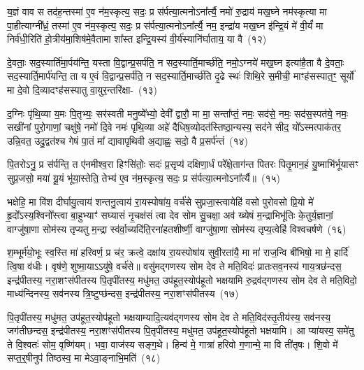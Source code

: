 य॒ज्ञं वाव स तद॑ह॒न्तस्मा॑ ए॒व न॑म॒स्कृत्य॒ सदः॒ प्र स॑र्पत्या॒त्मनो\-ऽना᳚र्त्यै॒ नमो॑ रु॒द्राय॑ मख॒घ्ने नम॑स्कृत्या मा पा॒हीत्याग्नी᳚ध्रं॒ तस्मा॑ ए॒व न॑म॒स्कृत्य॒ सदः॒ प्र स॑र्पत्या॒त्मनो\-ऽना᳚र्त्यै॒ नम॒ इन्द्रा॑य मख॒घ्न इ॑न्द्रि॒यं मे॑ वी॒र्यं॑ मा निर्व॑धी॒रिति॑ हो॒त्रीय॑मा॒शिष॑मे॒वैतामा शा᳚स्त इन्द्रि॒यस्य॑ वी॒र्य॑स्यानि॑र्घाताय॒ या वै~(१२)

दे॒वताः॒ सद॒स्यार्ति॑मा॒र्पय॑न्ति॒ यस्ता वि॒द्वान्प्र॒सर्प॑ति॒ न सद॒स्यार्ति॒मार्च्छ॑ति॒ नमो॒\-ऽग्नये॑ मख॒घ्न इत्या॑है॒ता वै दे॒वताः॒ सद॒स्यार्ति॒मार्प॑यन्ति॒ ता य ए॒वं वि॒द्वान्प्र॒सर्प॑ति॒ न सद॒स्यार्ति॒मार्च्छ॑ति दृ॒ढे स्थः॑ शिथि॒रे स॒मीची॒ माꣳह॑सस्पात॒ꣳ॒ सूर्यो॑ मा दे॒वो दि॒व्यादꣳह॑सस्पातु वा॒युर॒न्तरि॑क्षा-~(१३)

द॒ग्निः पृ॑थि॒व्या य॒मः पि॒तृभ्यः॒ सर॑स्वती मनु॒ष्ये᳚भ्यो॒ देवी᳚ द्वारौ॒ मा मा॒ सन्ता᳚प्तं॒ नमः॒ सद॑से॒ नमः॒ सद॑स॒स्पत॑ये॒ नमः॒ सखी॑नां पुरो॒गाणां॒ चक्षु॑षे॒ नमो॑ दि॒वे नमः॑ पृथि॒व्या अहे॑ दैधिष॒व्योदत॑स्तिष्ठा॒न्यस्य॒ सद॑ने सीद॒ यो᳚\-ऽस्मत्पाक॑तर॒ उन्नि॒वत॒ उदु॒द्वत॑श्च गेषं पा॒तं मा᳚ द्यावा\-पृथिवी अ॒द्याह्नः॒ सदो॒ वै प्र॒सर्प॑न्तं~(१४)

पि॒तरो\-ऽनु॒ प्र स॑र्पन्ति॒ त ए॑नमीश्व॒रा हिꣳसि॑तोः॒ सदः॑ प्र॒सृप्य॑ दक्षिणा॒र्धं परे᳚क्षे॒ताग॑न्त पितरः पितृ॒मान॒हं यु॒ष्माभि॑र्भूयासꣳ सुप्र॒जसो॒ मया॑ यू॒यं भू॑या॒स्तेति॒ तेभ्य॑ ए॒व न॑म॒स्कृत्य॒ सदः॒ प्र स॑र्पत्या॒त्मनो\-ऽना᳚र्त्यै॥~(१५)

{\anuvakamend[{म॒खो वा अ॒न्तरि॑क्षात्प्र॒सर्प॑न्त॒न्त्रय॑स्त्रिꣳशच्च}]}%

भक्षेहि॒ मा वि॑श दीर्घायु॒त्वाय॑ शन्तनु॒त्वाय॑ रा॒यस्पोषा॑य॒ वर्च॑से सुप्रजा॒स्त्वायेहि॑ वसो पुरोवसो प्रि॒यो मे॑ हृ॒दो᳚\-ऽस्य॒श्विनो᳚स्त्वा बा॒हुभ्याꣳ॑ सघ्यासं नृ॒चक्ष॑सं त्वा देव सोम सु॒चक्षा॒ अव॑ ख्येषं म॒न्द्राभिभू॑तिः के॒तुर्य॒ज्ञानां॒ वाग्जु॑षा॒णा सोम॑स्य तृप्यतु म॒न्द्रा स्व॑र्वा॒च्यदि॑ति॒रना॑हतशीर्ष्णी॒ वाग्जु॑षा॒णा सोम॑स्य तृप्य॒त्वेहि॑ विश्वचर्\mbox{}षणे~(१६)

श॒म्भूर्म॑यो॒भूः स्व॒स्ति मा॑ हरिवर्ण॒ प्र च॑र॒ क्रत्वे॒ दक्षा॑य रा॒यस्पोषा॑य सुवी॒रता॑यै॒ मा मा॑ राज॒न्वि बी॑भिषो॒ मा मे॒ हार्दि॑ त्वि॒षा व॑धीः। वृष॑णे॒ शुष्मा॒याऽऽयु॑षे॒ वर्च॑से॥ वसु॑मद्गणस्य सोम देव ते मति॒विदः॑ प्रातःसव॒नस्य॑ गाय॒त्रछ॑न्दस॒ इन्द्र॑पीतस्य॒ नरा॒शꣳस॑पीतस्य पि॒तृपी॑तस्य॒ मधु॑मत॒ उप॑हूत॒स्योप॑हूतो भक्षयामि रु॒द्रव॑द्गणस्य सोम देव ते मति॒विदो॒ माध्य॑न्दिनस्य॒ सव॑नस्य त्रि॒ष्टुप्छ॑न्दस॒ इन्द्र॑पीतस्य॒ नरा॒शꣳस॑पीतस्य~(१७)

पि॒तृपी॑तस्य॒ मधु॑मत॒ उप॑हूत॒स्योप॑हूतो भक्षयाम्यादि॒त्यव॑द्गणस्य सोम देव ते मति॒विद॑स्तृ॒तीय॑स्य॒ सव॑नस्य॒ जग॑तीछन्दस॒ इन्द्र॑पीतस्य॒ नरा॒शꣳस॑पीतस्य पि॒तृपी॑तस्य॒ मधु॑मत॒ उप॑हूत॒स्योप॑हूतो भक्षयामि। आ प्या॑यस्व॒ समे॑तु ते वि॒श्वतः॑ सोम॒ वृष्णि॑यम्। भवा॒ वाज॑स्य सङ्ग॒थे। हिन्व॑ मे॒ गात्रा॑ हरिवो ग॒णान्मे॒ मा वि ती॑तृषः। शि॒वो मे॑ सप्त॒र्॒\mbox{}षीनुप॑ तिष्ठस्व॒ मा मे\-ऽवा॒ङ्नाभि॒मति॑~(१८)

